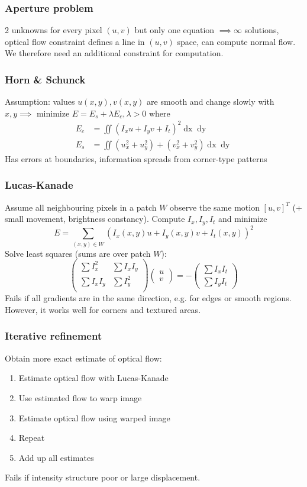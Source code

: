 \documentclass[a4paper,10pt]{article}
\begin{document}
\subsubsection{Aperture problem}
2 unknowns for every pixel \((u,v)\) but only one equation \(\implies \infty\)  solutions, optical flow constraint defines a line in \((u, v)\) space, can compute normal flow. We therefore need an additional constraint for computation.

\subsubsection{Horn \& Schunck}
Assumption: values \(u(x, y), v(x, y)\) are smooth and change slowly with \(x, y \implies\) minimize \(E = E_s + \lambda E_c, \lambda > 0\) where 
\begin{align*}
	E_c &= \iint (I_x u + I_y v + I_t)^2 \mathop{dx} \mathop{dy} \tag{brightness const.} \\ 
	E_s &= \iint (u^2_x + u^2_y) + (v^2_x + v^2_y) \mathop{dx} \mathop{dy} \tag{smoothness}
\end{align*}
Has errors at boundaries, information spreads from corner-type patterns

\subsubsection{Lucas-Kanade}
Assume all neighbouring pixels in a patch \(W\) observe the same motion \(\left[u, v\right]^T\) (+ small movement, brightness constancy). Compute \(I_x, I_y, I_t\) and minimize
\[E = \sum_{(x, y) \in W} (I_x(x, y)u + I_y(x, y)v + I_t(x, y))^2\]
Solve least squares (sums are over patch \(W\)):
\[
    \begin{pmatrix} 
        \sum I^2_x & \sum I_x I_y \\
    \sum I_x I_y & \sum I^2_y \\
    \end{pmatrix}
    \begin{pmatrix}
		u \\
        v
    \end{pmatrix}
	= -
	\begin{pmatrix}
	    \sum I_x I_t \\
	    \sum I_y I_t
	\end{pmatrix}
\] 
Fails if all gradients are in the same direction, e.g. for edges or smooth regions. However, it works well for corners and textured areas.

\subsubsection{Iterative refinement}
Obtain more exact estimate of optical flow:
\begin{enumerate}
	\item Estimate optical flow with Lucas-Kanade
	\item Use estimated flow to warp image
	\item Estimate optical flow using warped image
	\item Repeat
	\item Add up all estimates
\end{enumerate}
Fails if intensity structure poor or large displacement.
\end{document}
